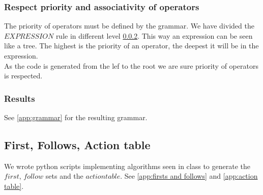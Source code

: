 \subsubsection{Respect priority and associativity of operators}

The priority of operators must be defined by the grammar. We have divided the $EXPRESSION$ rule in different level \ref{expression}. This way an expression can be seen like a tree. The highest is the priority of an operator, the deepest it will be in the expression.\\ As the code is generated from the lef to the root we are sure priority of operators is respected.  



\subsubsection{Results}
\label{expression}
See \ref{app:grammar} for the resulting grammar.

\subsection{First, Follows, Action table}

We wrote python scripts implementing algorithms seen in class to generate the $first$, $follow$ sets and the $action table$. See \ref{app:firsts and follows} and \ref{app:action table}.

